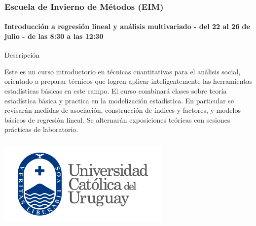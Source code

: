 \documentclass{beamer}\usepackage[]{graphicx}\usepackage[]{color}
\begin{document}
\begin{frame}
\frametitle{Escuela de Invierno de Métodos (EIM)} 
\framesubtitle{Introducción a regresión lineal y análisis multivariado - del 22 al 26 de julio - de las 8:30 a las 12:30}
\vspace{0.5cm}

Descripción

\vspace{0.25cm}

Este es un curso introductorio en técnicas cuantitativas para el análisis social, orientado a preparar técnicos que logren aplicar inteligentemente las herramientas estadísticas básicas en este campo. El curso combinará clases sobre teoría estadística básica y practica en la modelización estadística. En particular se revisarán medidas de asociación, construcción de índices y factores, y modelos básicos de regresión lineal. Se alternarán exposiciones teóricas con sesiones prácticas de laboratorio.

\vspace{0.25cm}
\end{frame}

\begin{frame}
\frametitle{} 

\vspace{0.5cm}

\includegraphics[width=\linewidth]{logo_ucu.png}

\vspace{0.25cm}
\end{frame}
\end{document}
